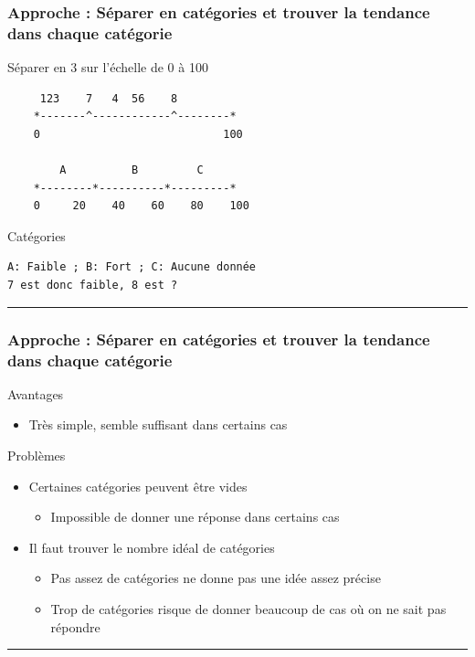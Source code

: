 \documentclass[french]{beamer}
\begin{document}
\begin{frame}[fragile]
\frametitle{Approche : Séparer en catégories et trouver la tendance dans
chaque
catégorie}

{Séparer en 3 sur l'échelle de 0 à
100}

\begin{verbatim}
     123    7   4  56    8 
    *-------^------------^--------*
    0                            100
    
        A          B         C
    *--------*----------*---------*
    0     20    40    60    80    100
\end{verbatim}

{Catégories}

\begin{verbatim}
A: Faible ; B: Fort ; C: Aucune donnée
7 est donc faible, 8 est ?
\end{verbatim}
\begin{center}\rule{3in}{0.4pt}\end{center}
\end{frame}

\begin{frame}
\frametitle{Approche : Séparer en catégories et trouver la tendance dans
chaque
catégorie}

{Avantages}

\begin{itemize}
\itemsep1pt\parskip0pt
\item
  Très simple, semble suffisant dans certains cas
\end{itemize}

{Problèmes}

\begin{itemize}
\itemsep1pt\parskip0pt
\item
  Certaines catégories peuvent être vides

  \begin{itemize}
  \itemsep1pt\parskip0pt
  \item
    Impossible de donner une réponse dans certains cas
  \end{itemize}
\item
  Il faut trouver le nombre idéal de catégories

  \begin{itemize}
  \itemsep1pt\parskip0pt
  \item
    Pas assez de catégories ne donne pas une idée assez précise
  \item
    Trop de catégories risque de donner beaucoup de cas où on ne sait
    pas répondre
  \end{itemize}
\end{itemize}
\begin{center}\rule{3in}{0.4pt}\end{center}
\end{frame}
\end{document}
